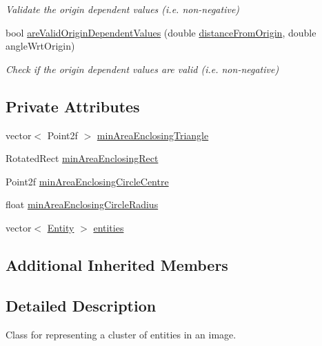 \begin{DoxyCompactItemize}
\begin{DoxyCompactList}\small\item\em Validate the origin dependent values (i.\-e. non-\/negative) \end{DoxyCompactList}\item 
bool \hyperlink{classmultiscale_1_1analysis_1_1Cluster_a05e8593354fabd5c1ca18b6a2b19096e}{are\-Valid\-Origin\-Dependent\-Values} (double \hyperlink{classmultiscale_1_1analysis_1_1SpatialEntityPseudo3D_a056f67b90ed41c0e6dc4df31b71ad906}{distance\-From\-Origin}, double angle\-Wrt\-Origin)
\begin{DoxyCompactList}\small\item\em Check if the origin dependent values are valid (i.\-e. non-\/negative) \end{DoxyCompactList}\end{DoxyCompactItemize}
\subsection*{Private Attributes}
\begin{DoxyCompactItemize}
\item 
vector$<$ Point2f $>$ \hyperlink{classmultiscale_1_1analysis_1_1Cluster_a7678d48581202c3ecc3f1283a1730dfa}{min\-Area\-Enclosing\-Triangle}
\item 
Rotated\-Rect \hyperlink{classmultiscale_1_1analysis_1_1Cluster_aeb032303a79c6bd43385fcaad9c50742}{min\-Area\-Enclosing\-Rect}
\item 
Point2f \hyperlink{classmultiscale_1_1analysis_1_1Cluster_a47e672060b4025dcd07ebb9c5fd99f0c}{min\-Area\-Enclosing\-Circle\-Centre}
\item 
float \hyperlink{classmultiscale_1_1analysis_1_1Cluster_a070994481884a4c7f5aa4879ce7b0568}{min\-Area\-Enclosing\-Circle\-Radius}
\item 
vector$<$ \hyperlink{classmultiscale_1_1analysis_1_1Entity}{Entity} $>$ \hyperlink{classmultiscale_1_1analysis_1_1Cluster_a820298479651328fb79d92a65f7923d6}{entities}
\end{DoxyCompactItemize}
\subsection*{Additional Inherited Members}


\subsection{Detailed Description}
Class for representing a cluster of entities in an image. 


